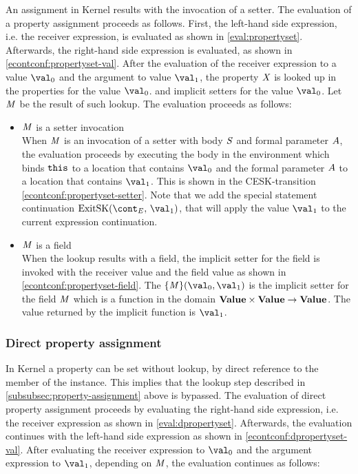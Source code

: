 \documentclass[a4paper,oneside]{article}
\begin{document}
An assignment in Kernel results with the invocation of a setter.
The evaluation of a property assignment proceeds as follows.
First, the left-hand side expression, i.e. the receiver expression, is evaluated as shown in \eqref{eval:propertyset}.
Afterwards, the right-hand side expression is evaluated, as shown in \eqref{econtconf:propertyset-val}.
After the evaluation of the receiver expression to a value $\val_0$ and the argument to value $\val_1$, the property $\mathit{X}$ is looked up in the properties for the value $\val_0$.
and implicit setters for the value $\val_0$.
Let $\mathit{M}$ be the result of such lookup.
The evaluation proceeds as follows:

\begin{itemize}
    \item $\mathit{M}$ is a setter invocation\\
        When $\mathit{M}$ is an invocation of a setter with body $\mathit{S}$ and formal parameter $A$, the evaluation proceeds by executing the body in the environment which binds $\tt{this}$ to a location that contains $\val_0$ and the formal parameter $A$ to a location that contains $\val_1$.
        This is shown in the CESK-transition \eqref{econtconf:propertyset-setter}.
        Note that we add the special statement continuation $\ExitSK{\val_1}$, that will apply the value $\val_1$ to the current expression continuation.

    \item $\mathit{M}$ is a field\\
        When the lookup results with a field, the implicit setter for the field is invoked with the receiver value and the field value as shown in \eqref{econtconf:propertyset-field}.
        The $\{\membermeta\}(\val_0, \val_1)$ is the implicit setter for the field $\mathit{M}$ which is a function in the domain $\mathbf{Value} \times \mathbf{Value} \rightarrow \mathbf{Value}$.
        The value returned by the implicit function is $\val_1$.

\end{itemize}


\subsubsection{Direct property assignment}
\label{subsubsec:direct-property-assignment}

In Kernel a property can be set without lookup, by direct reference to the member of the instance.
This implies that the lookup step described in \ref{subsubsec:property-assignment} above is bypassed.
The evaluation of direct property assignment proceeds by evaluating the right-hand side expression, i.e. the receiver expression as shown in \eqref{eval:dpropertyset}.
Afterwards, the evaluation continues with the left-hand side expression as shown in \eqref{econtconf:dpropertyset-val}.
After evaluating the receiver expression to $\val_0$ and the argument expression to $\val_1$, depending on $\mathit{M}$, the evaluation continues as follows:
\end{document}

